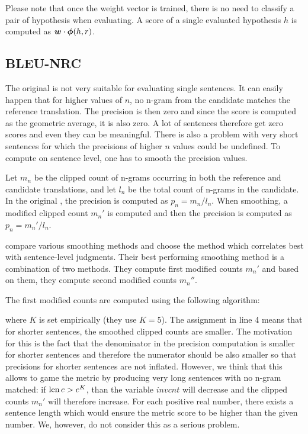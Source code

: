 Please note that once the weight vector is trained, there is no need to
classify a pair of hypothesis when evaluating. A score of a single evaluated hypothesis $h$
is computed as $\boldsymbol{w} \cdot \boldsymbol{\phi}(h,r)$.



\subsection{BLEU-NRC}

The original  is not very suitable for evaluating single sentences. It
can easily happen that for higher values of $n$, no n-gram from the candidate
matches the reference translation. The precision is then zero and since
the  score is computed as the geometric average, it is also zero.
A lot of sentences therefore get zero scores and even they can be meaningful. There
is also a problem with very short sentences for which the precisions of higher
$n$ values could be undefined. To compute  on sentence level, one
has to smooth the precision values.

Let $m_n$ be the clipped count of n-grams occurring in both the reference and
candidate translations, and let $l_n$ be the total count of n-grams in the
candidate. In the original , the precision is computed as $p_n = m_n /
l_n$. When smoothing, a modified clipped count $m_n'$ is computed and then the
precision is computed as $p_n = m_n' / l_n$. 

 compare various smoothing methods and choose
the method which correlates best with sentence-level judgments. Their best
performing smoothing method is a combination of two methods. They compute first
modified counts $m_n'$ and based on them, they compute second modified counts
$m_n''$.

The first modified counts are computed using the following algorithm:
\begin{algorithmic}[1]    
     \Else {} \EndIf \EndFor
\end{algorithmic} where $K$ is set empirically (they use $K = 5$). The
assignment in line 4 means that for shorter sentences, the smoothed clipped
counts are smaller. The motivation for this is the fact that the denominator in
the precision computation is smaller for shorter sentences and therefore the
numerator should be also smaller so that precisions for shorter sentences are
not inflated. However, we think that this allows to game the metric by
producing very long sentences with no n-gram matched: if $\operatorname{len}{c} > e^K$, than
the variable $invcnt$ will decrease and the clipped counts $m_n'$ will
therefore increase. For each positive real number, there exists a sentence
length which would ensure the metric score to be higher than the given number.
We, however, do not consider this as a serious problem.

